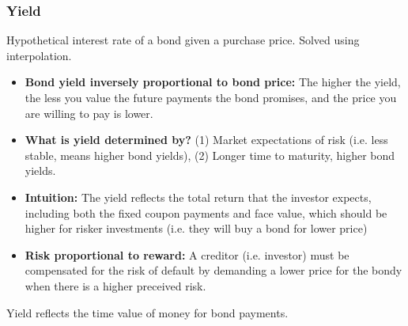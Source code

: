 \subsubsection{Yield}
\begin{definition}
    Hypothetical interest rate of a bond given a purchase price. Solved using interpolation.
        \begin{itemize}
            \item \textbf{Bond yield inversely proportional to bond price:} The higher the yield, the less you value the future payments the bond promises, and the price you are willing to pay is lower.
            \item \textbf{What is yield determined by?} (1) Market expectations of risk (i.e. less stable, means higher bond yields), (2) Longer time to maturity, higher bond yields.
        \end{itemize}
\end{definition}

\begin{intuition}
    \begin{itemize}
        \item \textbf{Intuition:} The yield reflects the total return that the investor expects, including both the fixed coupon payments and face value, which should be higher for risker investments (i.e. they will buy a bond for lower price) 
        \item \textbf{Risk proportional to reward:} A creditor (i.e. investor) must be compensated for the risk of default by demanding a lower price for the bondy when there is a higher preceived risk. 
    \end{itemize}
\end{intuition}

\begin{warning}
    Yield reflects the time value of money for bond payments.
\end{warning}

